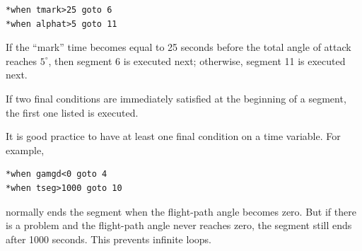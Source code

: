 \begin{lstlisting}[style=taosmanual]
*when tmark>25 goto 6
*when alphat>5 goto 11
\end{lstlisting}

If the ``mark'' time becomes equal to 25 seconds before the total angle of attack
reaches $5^{\circ}$, then segment 6 is executed next; otherwise, segment 11 is
executed next.

If two final conditions are immediately satisfied at the beginning of a segment, the
first one listed is executed.

It is good practice to have at least one final condition on a time variable. For example,

\begin{lstlisting}[style=taosmanual]
*when gamgd<0 goto 4
*when tseg>1000 goto 10
\end{lstlisting}

normally ends the segment when the flight-path angle becomes zero. But if there is
a problem and the flight-path angle never reaches zero, the segment still ends after
1000 seconds. This prevents infinite loops.
